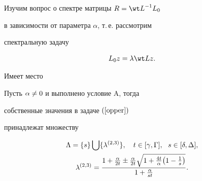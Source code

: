Изучим вопрос о спектре матрицы $R={\wt L}^{-1}L_0$


в зависимости от параметра $\alpha$, т.\,е. рассмотрим


спектральную задачу


\begin{equation}


\label{opper}


L_0 z=\lambda \wt L z.


\end{equation}


Имеет место





\begin{thm}


Пусть $\alpha \neq 0$ и выполнено условие $\mathrm A$, тогда


собственные значения в задаче $(\ref{opper})$


принадлежат множеству


\begin{gather}


\Lambda=\{s\}\bigcup\{ \lambda^{(2,3)}\},\quad


t\in [\zg,\zG],\ \ s\in [\zd,\zD],\notag \\


%


\label{equa6}


\lambda^{(2,3)}=


\dfrac{1+\frac{\za}{2t} \pm\frac{\za}{2t}


\sqrt{1+\frac{4t}{\za}\big(1-\frac1{s}\big)}}{1+\frac{\za}{st}}.


\end{gather}


\end{thm}





